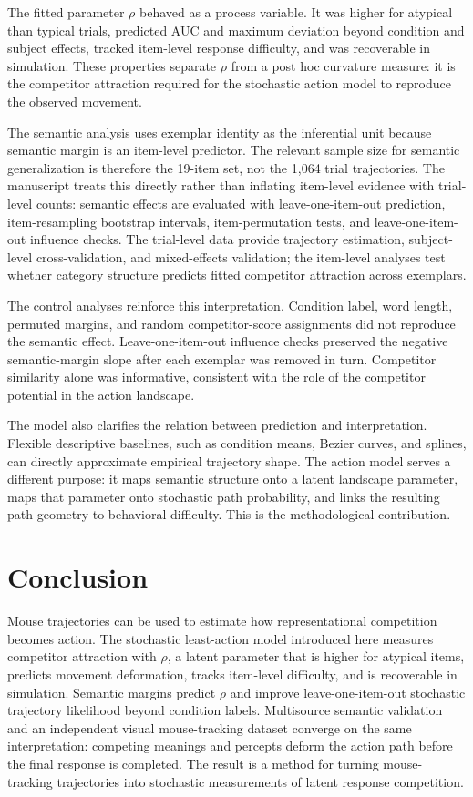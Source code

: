 \documentclass[11pt,final]{article}
\begin{document}
The fitted parameter $\rho$ behaved as a process variable. It was higher for atypical than typical trials, predicted AUC and maximum deviation beyond condition and subject effects, tracked item-level response difficulty, and was recoverable in simulation. These properties separate $\rho$ from a post hoc curvature measure: it is the competitor attraction required for the stochastic action model to reproduce the observed movement.

The semantic analysis uses exemplar identity as the inferential unit because semantic margin is an item-level predictor. The relevant sample size for semantic generalization is therefore the 19-item set, not the 1,064 trial trajectories. The manuscript treats this directly rather than inflating item-level evidence with trial-level counts: semantic effects are evaluated with leave-one-item-out prediction, item-resampling bootstrap intervals, item-permutation tests, and leave-one-item-out influence checks. The trial-level data provide trajectory estimation, subject-level cross-validation, and mixed-effects validation; the item-level analyses test whether category structure predicts fitted competitor attraction across exemplars.

The control analyses reinforce this interpretation. Condition label, word length, permuted margins, and random competitor-score assignments did not reproduce the semantic effect. Leave-one-item-out influence checks preserved the negative semantic-margin slope after each exemplar was removed in turn. Competitor similarity alone was informative, consistent with the role of the competitor potential in the action landscape.

The model also clarifies the relation between prediction and interpretation. Flexible descriptive baselines, such as condition means, Bezier curves, and splines, can directly approximate empirical trajectory shape. The action model serves a different purpose: it maps semantic structure onto a latent landscape parameter, maps that parameter onto stochastic path probability, and links the resulting path geometry to behavioral difficulty. This is the methodological contribution.

\section{Conclusion}

Mouse trajectories can be used to estimate how representational competition becomes action. The stochastic least-action model introduced here measures competitor attraction with $\rho$, a latent parameter that is higher for atypical items, predicts movement deformation, tracks item-level difficulty, and is recoverable in simulation. Semantic margins predict $\rho$ and improve leave-one-item-out stochastic trajectory likelihood beyond condition labels. Multisource semantic validation and an independent visual mouse-tracking dataset converge on the same interpretation: competing meanings and percepts deform the action path before the final response is completed. The result is a method for turning mouse-tracking trajectories into stochastic measurements of latent response competition.
\end{document}
